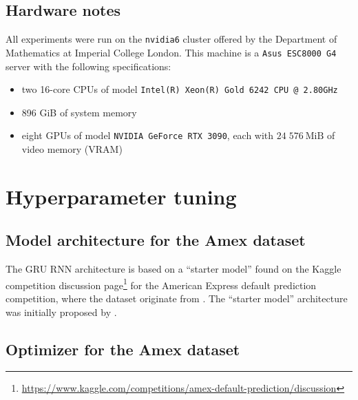 \documentclass{statsmsc}
\begin{document}
{\section{Hardware notes}%
\label{sec:Hardware notes}

All experiments were run on the \texttt{nvidia6} cluster offered by the Department of Mathematics
at Imperial College London. This machine is a \texttt{Asus ESC8000 G4} server with the following
specifications:
\begin{itemize}
    \item two 16-core CPUs of model \texttt{Intel(R) Xeon(R) Gold 6242 CPU @ 2.80GHz}
    \item 896 GiB of system memory
    \item eight GPUs of model \texttt{NVIDIA GeForce RTX 3090}, each with
        $24\;576~\textrm{MiB}$ of video memory (VRAM)
\end{itemize}


\chapter{Hyperparameter tuning}%
\label{cha:Hyperparameter tuning}

\section{Model architecture for the Amex dataset}%
\label{sec:hyp_amex_mod}

The \ac{GRU} \ac{RNN} architecture is based on a ``starter model'' found on the Kaggle competition
discussion page\footnote{
    \url{https://www.kaggle.com/competitions/amex-default-prediction/discussion}
} for the American Express default prediction competition, where the dataset
originate from \citep{amex-data}. The ``starter model'' architecture was initially
proposed by \cite{amex-starter}.

\section{Optimizer for the Amex dataset}%
\label{sec:hyp_amex_opt}

}
\end{document}
